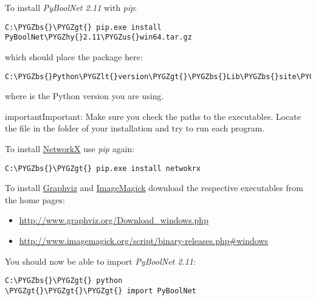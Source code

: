 \documentclass[letterpaper,10pt,english]{sphinxmanual}
\def\PYGZbs{\char`\\}
\def\PYGZus{\char`\_}
\def\PYGZlt{\char`\<}
\def\PYGZgt{\char`\>}
\def\PYGZhy{\char`\-}
\begin{document}
To install \emph{PyBoolNet 2.11} with \emph{pip}:

\begin{Verbatim}[commandchars=\\\{\}]
C:\PYGZbs{}\PYGZgt{} pip.exe install PyBoolNet\PYGZhy{}2.11\PYGZus{}win64.tar.gz
\end{Verbatim}

which should place the package here:

\begin{Verbatim}[commandchars=\\\{\}]
C:\PYGZbs{}Python\PYGZlt{}version\PYGZgt{}\PYGZbs{}Lib\PYGZbs{}site\PYGZhy{}packages
\end{Verbatim}

where  is the Python version you are using.

\begin{notice}{important}{Important:}
Make sure you check the paths to the executables. Locate the file  in the  folder of your installation and
try to run each program.
\end{notice}

To install \href{https://networkx.github.io/}{NetworkX} use \emph{pip} again:

\begin{Verbatim}[commandchars=\\\{\}]
C:\PYGZbs{}\PYGZgt{} pip.exe install netwokrx
\end{Verbatim}

To install \href{http://www.graphviz.org/}{Graphviz} and \href{http://www.imagemagick.org/script/index.php}{ImageMagick} download the respective executables from the home pages:
\begin{itemize}
\item {} 
\href{http://www.graphviz.org/Download\_windows.php}{http://www.graphviz.org/Download\_windows.php}

\item {} 
\href{http://www.imagemagick.org/script/binary-releases.php\#windows}{http://www.imagemagick.org/script/binary-releases.php\#windows}

\end{itemize}

You should now be able to import \emph{PyBoolNet 2.11}:

\begin{Verbatim}[commandchars=\\\{\}]
C:\PYGZbs{}\PYGZgt{} python
\PYGZgt{}\PYGZgt{}\PYGZgt{} import PyBoolNet
\end{Verbatim}
\end{document}
